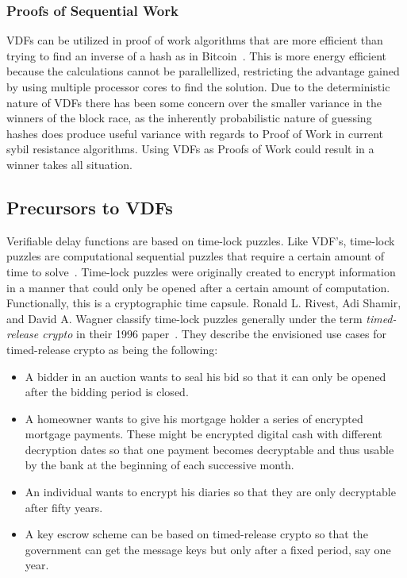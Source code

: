\subsubsection{Proofs of Sequential Work}
VDFs can be utilized in proof of work algorithms that are more efficient than trying to find an inverse of a hash as in Bitcoin~\cite{Cohen2018-th}. This is more energy efficient because the calculations cannot be parallellized, restricting the advantage gained by using multiple processor cores to find the solution. Due to the deterministic nature of VDFs there has been some concern over the smaller variance in the winners of the block race, as the inherently probabilistic nature of guessing hashes does produce useful variance with regards to Proof of Work in current sybil resistance algorithms. Using VDFs as Proofs of Work could result in a winner takes all situation.~\cite{Orlicki2020-rt}

\subsection{Precursors to VDFs}
Verifiable delay functions are based on time-lock puzzles. Like VDF's, time-lock puzzles are computational sequential puzzles that require a certain amount of time to solve~\cite{Rivest_undated-qr}. Time-lock puzzles were originally created to encrypt information in a manner that could only be opened after a certain amount of computation. Functionally, this is a cryptographic time capsule. Ronald L. Rivest, Adi Shamir, and David A. Wagner classify time-lock puzzles generally under the term \emph{timed-release crypto} in their 1996 paper~\cite{Rivest_undated-qr}. They describe the envisioned use cases for timed-release crypto as being the following:

\begin{itemize}
	\item A bidder in an auction wants to seal his bid so that it can only be opened after the bidding period is closed.
	\item A homeowner wants to give his mortgage holder a series of encrypted mortgage payments. These might be encrypted digital cash with different decryption dates so that one payment becomes decryptable and thus usable by the bank at the beginning of each successive month.
	\item An individual wants to encrypt his diaries so that they are only decryptable after fifty years.
	\item A key escrow scheme can be based on timed-release crypto so that the government can get the message keys but only after a fixed period, say one year.
\end{itemize}

